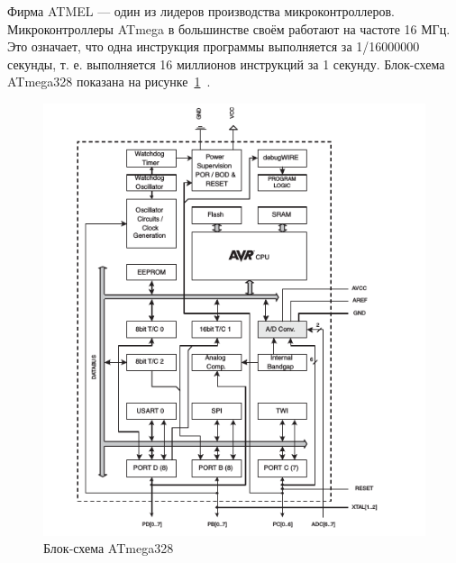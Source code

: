 Фирма ATMEL --- один из лидеров производства микроконтроллеров. Микроконтроллеры ATmega в большинстве своём работают на частоте 16 МГц. Это означает, что одна инструкция программы выполняется за 1/16000000 секунды, т. е. выполняется 16 миллионов инструкций за 1 секунду. Блок-схема ATmega328 показана на рисунке~\ref{fig:atmegablock}~\cite{atmega:328}.

\begin{figure}[ht]
    \includegraphics[width=.6\linewidth]{Figures/atmegablock.png}
    \caption{Блок-схема ATmega328}
    \label{fig:atmegablock}
\end{figure}
